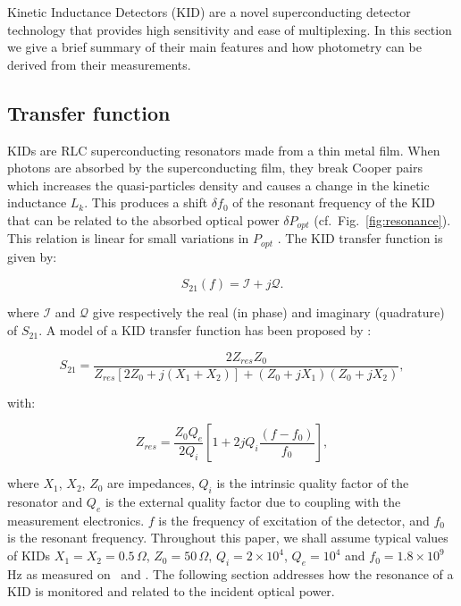 Kinetic Inductance Detectors (KID) are a novel superconducting detector technology
that provides high sensitivity and ease of multiplexing. In this section we give
a brief summary of their main features and how photometry can be derived from
their measurements.

\subsection{Transfer function}

KIDs are RLC superconducting resonators made from a thin metal film. When
photons are absorbed by the superconducting film, they break Cooper pairs which
increases the quasi-particles density and causes a change in the kinetic
inductance $L_{k}$. This produces a shift $\delta f_{0}$ of the resonant
frequency of the KID \citep{2013A&A...551L..12C} that can be related to the
absorbed optical power $\delta P_{opt}$ (cf.~Fig.~\ref{fig:resonance}). This
relation is linear for small variations in $P_{opt}$
\citep{2010ApPhL..96z3511S}. The KID transfer function is given by:

\begin{equation}
S_{21}(f) = \mathcal{I} +j\mathcal{Q} .
\end{equation}

\noindent where $\mathcal{I}$ and $\mathcal{Q}$ give respectively the real (in phase) and imaginary
(quadrature) of $S_{21}$. A model of a KID transfer function has been proposed
by \citet{2008ApPhL..93m4102G} :

\begin{equation}
S_{21} = \frac{2Z_{res}Z_{0}}{Z_{res}[2Z_{0} + j(X_{1}+X_{2})] + (Z_{0} +jX_{1})(Z_{0} +jX_{2})},
\end{equation}

with:

\begin{equation}
Z_{res} = \frac{Z_{0}Q_{e}}{2Q_{i}}[1 + 2jQ_{i}\frac{(f-f_{0})}{f_{0}}],
\end{equation}

\noindent where $X_{1}$, $X_{2}$, $Z_{0}$ are impedances, $Q_{i}$ is the
intrinsic quality factor of the resonator and $Q_{e}$ is the external quality
factor due to coupling with the measurement electronics. $f$ is the frequency of
excitation of the detector, and $f_{0}$ is the resonant frequency. Throughout
this paper, we shall assume typical values of KIDs $X_{1} = X_{2} =
0.5\,\Omega$, $Z_{0} = 50\,\Omega$, $Q_i=2\times 10^4$, $Q_e=10^4$ and $f_{0} =
1.8\times 10^9$\,Hz as measured on \nika\ and \nikad. The following section
addresses how the resonance of a KID is monitored and related to the incident
optical power.


